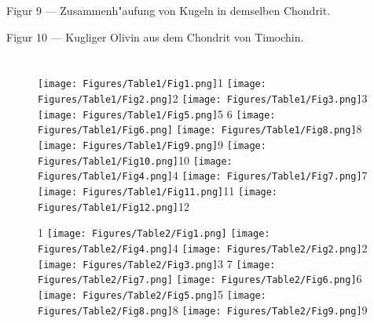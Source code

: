 \documentclass[a4paper, 11pt, oneside]{article}
\begin{document}
Figur 9 --- Zusammenh"aufung von Kugeln in demselben Chondrit.

Figur 10 --- Kugliger Olivin aus dem Chondrit von Timochin.
\section{}
\clearpage
\setlength\intextsep{0pt}
\pagestyle{fancy}
\fancyhf{}
\cfoot{\thepage}
\begin{figure}[p]
\texttt{[image: Figures/Table1/Fig1.png]}\tiny 1
\texttt{[image: Figures/Table1/Fig2.png]}\tiny 2
\texttt{[image: Figures/Table1/Fig3.png]}\tiny 3
\texttt{[image: Figures/Table1/Fig5.png]}\tiny 5
\tiny   6
\texttt{[image: Figures/Table1/Fig6.png]}
\texttt{[image: Figures/Table1/Fig8.png]}\tiny 8
\texttt{[image: Figures/Table1/Fig9.png]}\tiny 9
\texttt{[image: Figures/Table1/Fig10.png]}\tiny 10
\texttt{[image: Figures/Table1/Fig4.png]}\tiny 4
\texttt{[image: Figures/Table1/Fig7.png]}\tiny 7
\texttt{[image: Figures/Table1/Fig11.png]}\tiny 11
\texttt{[image: Figures/Table1/Fig12.png]}\tiny 12
\end{figure}
\clearpage
{}
\cfoot{\thepage}
\begin{figure}[p]
\tiny 1
\texttt{[image: Figures/Table2/Fig1.png]}
\texttt{[image: Figures/Table2/Fig4.png]}\tiny 4
\texttt{[image: Figures/Table2/Fig2.png]}\tiny 2
\texttt{[image: Figures/Table2/Fig3.png]}\tiny 3
\tiny 7
\texttt{[image: Figures/Table2/Fig7.png]}
\texttt{[image: Figures/Table2/Fig6.png]}\tiny 6
\texttt{[image: Figures/Table2/Fig5.png]}\tiny 5
\texttt{[image: Figures/Table2/Fig8.png]}\tiny 8
\texttt{[image: Figures/Table2/Fig9.png]}\tiny 9
\end{figure}
\clearpage
{}
\cfoot{\thepage}
\end{document}
